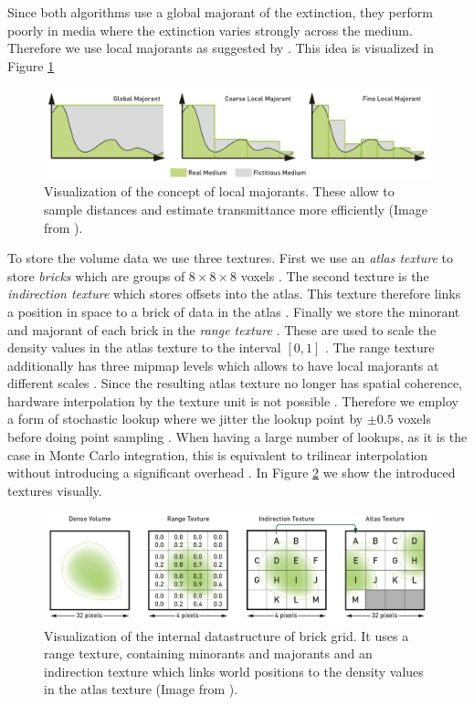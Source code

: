 Since both algorithms use a global majorant of the extinction, they perform poorly in media where the extinction varies strongly across the medium.
Therefore we use local majorants as suggested by \citeauthor{brick_grid} \cite{brick_grid}.
This idea is visualized in Figure \ref{fig:brick_grid_majorants}
\begin{figure}[ht]
    \centering
    \includegraphics[width=0.9\linewidth]{img/brick_grid_majorants.png}
    \caption[Visualization of local density majorants]{Visualization of the concept of local majorants. These allow to sample distances and estimate transmittance more efficiently (Image from \cite{brick_grid}).}
    \label{fig:brick_grid_majorants}
\end{figure}
To store the volume data we use three textures.
First we use an \textit{atlas texture} to store \textit{bricks} which are groups of $8 \times 8 \times 8$ voxels \cite{brick_grid}.
The second texture is the \textit{indirection texture} which stores offsets into the atlas.
This texture therefore links a position in space to a brick of data in the atlas \cite{brick_grid}.
Finally we store the minorant and majorant of each brick in the \textit{range texture} \cite{brick_grid}.
These are used to scale the density values in the atlas texture to the interval $[0, 1]$ \cite{brick_grid}.
The range texture additionally has three mipmap levels which allows to have local majorants at different scales \cite{brick_grid}.
Since the resulting atlas texture no longer has spatial coherence, hardware interpolation by the texture unit is not possible \cite{brick_grid}.
Therefore we employ a form of stochastic lookup where we jitter the lookup point by $\pm0.5$ voxels before doing point sampling \cite{brick_grid}.
When having a large number of lookups, as it is the case in Monte Carlo integration, this is equivalent to trilinear interpolation without introducing a significant overhead \cite{brick_grid}.
In Figure \ref{fig:brick_grid_datastructure} we show the introduced textures visually.
\begin{figure}[ht]
    \centering
    \includegraphics[width=0.9\linewidth]{img/brick_grid_datastructure.png}
    \caption[Datastructure of brick grid]{Visualization of the internal datastructure of brick grid. It uses a range texture, containing minorants and majorants and an indirection texture which links world positions to the density values in the atlas texture (Image from \cite{brick_grid}).}
    \label{fig:brick_grid_datastructure}
\end{figure}

